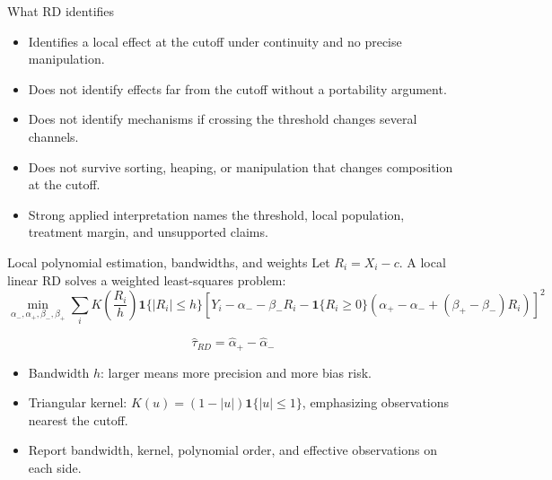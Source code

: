 \documentclass[aspectratio=169,11pt]{beamer}
\newcommand{\1}{\mathbf{1}}
\begin{document}
\begin{frame}{What RD identifies}
\begin{itemize}
    \item Identifies a local effect at the cutoff under continuity and no precise manipulation.
    \item Does not identify effects far from the cutoff without a portability argument.
    \item Does not identify mechanisms if crossing the threshold changes several channels.
    \item Does not survive sorting, heaping, or manipulation that changes composition at the cutoff.
    \item Strong applied interpretation names the threshold, local population, treatment margin, and unsupported claims.
\end{itemize}
\end{frame}

\begin{frame}{Local polynomial estimation, bandwidths, and weights}
\small
Let $R_i=X_i-c$. A local linear RD solves a weighted least-squares problem:
\[
\min_{\alpha_-,\alpha_+,\beta_-,\beta_+}
\sum_i K\!\left(\frac{R_i}{h}\right)\1\{|R_i|\le h\}
\left[
Y_i-\alpha_- -\beta_-R_i
-\1\{R_i\ge0\}\left(\alpha_+-\alpha_-+(\beta_+-\beta_-)R_i\right)
\right]^2
\]

\[
\widehat{\tau}_{RD}=\widehat{\alpha}_+-\widehat{\alpha}_-
\]

\begin{itemize}
    \item Bandwidth $h$: larger means more precision and more bias risk.
    \item Triangular kernel: $K(u)=(1-|u|)\1\{|u|\le1\}$, emphasizing observations nearest the cutoff.
    \item Report bandwidth, kernel, polynomial order, and effective observations on each side.
\end{itemize}
\end{frame}
\end{document}
